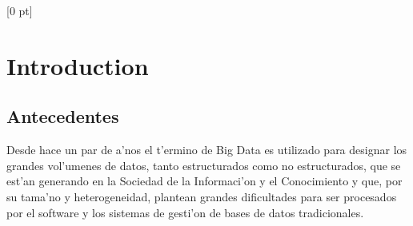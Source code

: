 \titlespacing{\chapter}{0 pt}{30 pt}{50 pt}[0 pt]
\titleformat{\section}{\Large\bfseries}{\thesection}{0 pt}{\hspace{30 pt}}
\titleformat{\subsection}{\large\bfseries}{\thesubsection}{0 pt}{\hspace{30 pt}}
\pagestyle{fancy}
\fancyhead[LO,LE]{\footnotesize\textit{\leftmark}}
\fancyhead[RO,RE]{\thepage}
\fancyfoot[CO,CE]{}

\chapter{Introduction} %

\normalsize

\section{Antecedentes}
\vspace{30 pt}
\noindent
Desde hace un par de a'nos el t'ermino de Big Data es utilizado para designar los grandes vol'umenes de datos, tanto estructurados como no estructurados, que se est'an generando en la Sociedad de la Informaci'on y el Conocimiento y que, por su tama'no y heterogeneidad, plantean grandes dificultades para ser procesados por el software y los sistemas de gesti'on de bases de datos tradicionales.\\

